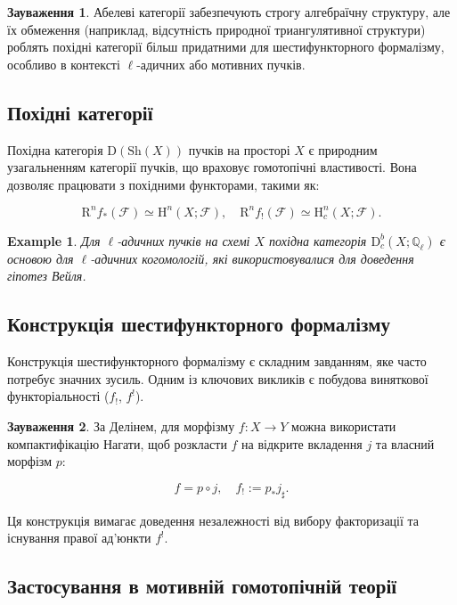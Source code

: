 \documentclass{article}
\theoremstyle{plain}
\newtheorem{example}{Example}
\theoremstyle{definition}
\newtheorem{remark}{Зауваження}[section]
\begin{document}
\begin{remark}
Абелеві категорії забезпечують строгу алгебраїчну структуру, але їх обмеження (наприклад, відсутність природної триангулятивної структури) роблять похідні категорії більш придатними для шестифункторного формалізму, особливо в контексті \(\ell\)-адичних або мотивних пучків.
\end{remark}

\subsection{Похідні категорії}

Похідна категорія \( \mathrm{D}(\mathrm{Sh}(X)) \) пучків на просторі \( X \) є природним узагальненням категорії пучків, що враховує гомотопічні властивості. Вона дозволяє працювати з похідними функторами, такими як:

\[
\mathrm{R}^n f_*(\mathscr{F}) \simeq \mathrm{H}^n(X; \mathscr{F}), \quad \mathrm{R}^n f_!(\mathscr{F}) \simeq \mathrm{H}_c^n(X; \mathscr{F}).
\]

\begin{example}
Для \(\ell\)-адичних пучків на схемі \( X \) похідна категорія \( \mathrm{D}_c^b(X; \mathbb{Q}_\ell) \) є основою для \(\ell\)-адичних когомологій, які використовувалися для доведення гіпотез Вейля.
\end{example}

\subsection{Конструкція шестифункторного формалізму}

Конструкція шестифункторного формалізму є складним завданням, яке часто потребує значних зусиль. Одним із ключових викликів є побудова виняткової функторіальності (\( f_! \), \( f^! \)).

\begin{remark}
За Делінем, для морфізму \( f: X \to Y \) можна використати компактифікацію Нагати, щоб розкласти \( f \) на відкрите вкладення \( j \) та власний морфізм \( p \):

\[
f = p \circ j, \quad f_! := p_* j_\sharp.
\]

Ця конструкція вимагає доведення незалежності від вибору факторизації та існування правої ад’юнкти \( f^! \).
\end{remark}

\subsection{Застосування в мотивній гомотопічній теорії}
\end{document}
